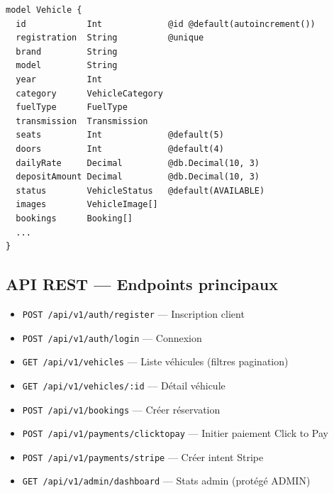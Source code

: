 \documentclass[12pt, a4paper]{article}
\begin{document}
\begin{verbatim}
model Vehicle {
  id            Int             @id @default(autoincrement())
  registration  String          @unique
  brand         String
  model         String
  year          Int
  category      VehicleCategory
  fuelType      FuelType
  transmission  Transmission
  seats         Int             @default(5)
  doors         Int             @default(4)
  dailyRate     Decimal         @db.Decimal(10, 3)
  depositAmount Decimal         @db.Decimal(10, 3)
  status        VehicleStatus   @default(AVAILABLE)
  images        VehicleImage[]
  bookings      Booking[]
  ...
}
\end{verbatim}

\subsection{API REST — Endpoints principaux}
\begin{itemize}[leftmargin=*,noitemsep]
  \item \texttt{POST /api/v1/auth/register} — Inscription client
  \item \texttt{POST /api/v1/auth/login} — Connexion
  \item \texttt{GET /api/v1/vehicles} — Liste véhicules (filtres pagination)
  \item \texttt{GET /api/v1/vehicles/:id} — Détail véhicule
  \item \texttt{POST /api/v1/bookings} — Créer réservation
  \item \texttt{POST /api/v1/payments/clicktopay} — Initier paiement Click to Pay
  \item \texttt{POST /api/v1/payments/stripe} — Créer intent Stripe
  \item \texttt{GET /api/v1/admin/dashboard} — Stats admin (protégé ADMIN)
\end{itemize}
\end{document}
